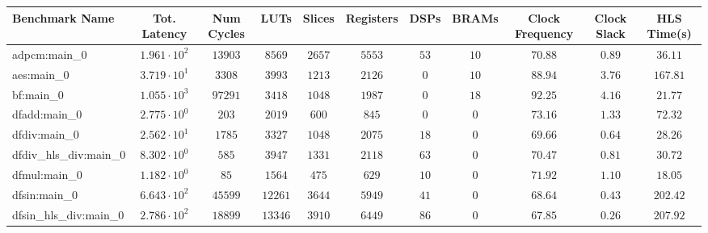 \begin{tabular}{|l|c|c|c|c|c|c|c|c|c|c|}
\hline
Benchmark Name          & Tot. Latency           & Num Cycles & LUTs      & Slices    & Registers & DSPs    & BRAMs   & Clock Frequency & Clock Slack & HLS Time(s) \\
\hline
adpcm:main\_0           & $ 1.961 \cdot 10^{2} $ & $ 13903  $ & $ 8569  $ & $ 2657  $ & $ 5553  $ & $ 53  $ & $ 10  $ & $ 70.88       $ & $ 0.89    $ & $ 36.11   $ \\
aes:main\_0             & $ 3.719 \cdot 10^{1} $ & $ 3308   $ & $ 3993  $ & $ 1213  $ & $ 2126  $ & $ 0   $ & $ 10  $ & $ 88.94       $ & $ 3.76    $ & $ 167.81  $ \\
bf:main\_0              & $ 1.055 \cdot 10^{3} $ & $ 97291  $ & $ 3418  $ & $ 1048  $ & $ 1987  $ & $ 0   $ & $ 18  $ & $ 92.25       $ & $ 4.16    $ & $ 21.77   $ \\
dfadd:main\_0           & $ 2.775 \cdot 10^{0} $ & $ 203    $ & $ 2019  $ & $ 600   $ & $ 845   $ & $ 0   $ & $ 0   $ & $ 73.16       $ & $ 1.33    $ & $ 72.32   $ \\
dfdiv:main\_0           & $ 2.562 \cdot 10^{1} $ & $ 1785   $ & $ 3327  $ & $ 1048  $ & $ 2075  $ & $ 18  $ & $ 0   $ & $ 69.66       $ & $ 0.64    $ & $ 28.26   $ \\
dfdiv\_hls\_div:main\_0 & $ 8.302 \cdot 10^{0} $ & $ 585    $ & $ 3947  $ & $ 1331  $ & $ 2118  $ & $ 63  $ & $ 0   $ & $ 70.47       $ & $ 0.81    $ & $ 30.72   $ \\
dfmul:main\_0           & $ 1.182 \cdot 10^{0} $ & $ 85     $ & $ 1564  $ & $ 475   $ & $ 629   $ & $ 10  $ & $ 0   $ & $ 71.92       $ & $ 1.10    $ & $ 18.05   $ \\
dfsin:main\_0           & $ 6.643 \cdot 10^{2} $ & $ 45599  $ & $ 12261 $ & $ 3644  $ & $ 5949  $ & $ 41  $ & $ 0   $ & $ 68.64       $ & $ 0.43    $ & $ 202.42  $ \\
dfsin\_hls\_div:main\_0 & $ 2.786 \cdot 10^{2} $ & $ 18899  $ & $ 13346 $ & $ 3910  $ & $ 6449  $ & $ 86  $ & $ 0   $ & $ 67.85       $ & $ 0.26    $ & $ 207.92  $ \\

\end{tabular}
